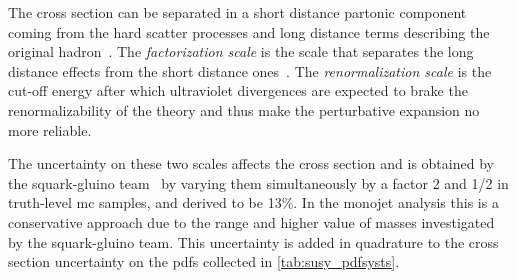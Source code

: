 The cross section can be separated in a short distance partonic component coming
from the hard scatter processes and long distance terms describing the original
hadron~\cite{FactorizationScale}. The \emph{factorization scale} is the scale
that separates the long distance effects from the short distance
ones~\cite{PerturbativeQCDHandbook}. The \emph{renormalization scale} is the
cut-off energy after which ultraviolet divergences are expected to brake the
renormalizability of the theory and thus make the perturbative expansion no more
reliable.

The uncertainty on these two scales affects the cross section and is obtained by
the squark-gluino team~\cite{SquarkGluinoTeam} by varying them simultaneously by
a factor 2 and 1/2 in truth-level \gls{mc} samples, and derived to be 13\%. In
the monojet analysis this is a conservative approach due to the range and higher
value of masses investigated by the squark-gluino team. This uncertainty is
added in quadrature to the cross section uncertainty on the \glspl{pdf}
collected in \ref{tab:susy_pdfsysts}.


